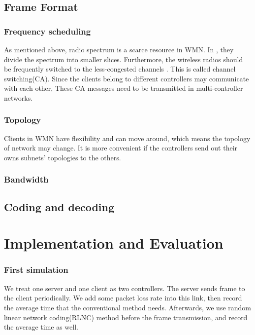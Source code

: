 \documentclass[10pt,conference,final]{IEEEtran}
\begin{document}
	\subsection{Frame Format}
	
	\subsubsection{Frequency scheduling}
	As mentioned above, radio spectrum is a scarce resource in WMN. In \cite{huang2015software}, they divide the spectrum into smaller slices. Furthermore, the wireless radios should be frequently switched to the less-congested channels \cite{sajjadi2016comparative}. This is called channel switching(CA). Since the clients belong to different controllers may communicate with each other, These CA messages need to be transmitted in multi-controller networks.
	
	
	\subsubsection{Topology}
	
	Clients in WMN have flexibility and can move around, which means the topology of network may change. It is more convenient if the controllers send out their owns subnets' topologies to the others.
	
	\subsubsection{Bandwidth}
	
	\subsection{Coding and decoding}
	
	
	\section{Implementation and Evaluation}
	
	\subsubsection{First simulation}
	We treat one server and one client as two controllers. The server sends frame to the client periodically. We add some packet loss rate into this link, then record the average time that the conventional method needs. Afterwards, we use random linear network coding(RLNC) method before the frame transmission, and record the average time as well.
	
\end{document}
